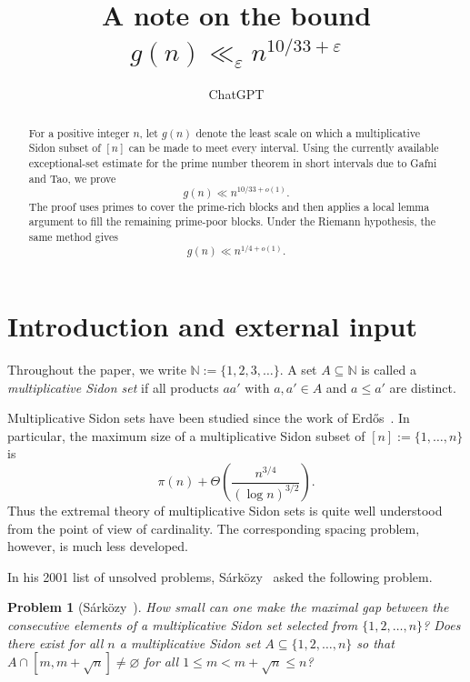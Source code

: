 \documentclass[11pt,reqno]{amsart}
\numberwithin{equation}{section}
\theoremstyle{plain}
\newtheorem{problem}[theorem]{Problem}
\theoremstyle{definition}
\newcommand{\N}{\mathbb N}
\begin{document}
\title[An upper bound for gaps in multiplicative Sidon sets]
{A note on the bound $g(n)\ll_\varepsilon n^{10/33+\varepsilon}$}

\author{ChatGPT}
\date{}

\begin{abstract}
For a positive integer \(n\), let \(g(n)\) denote the least scale on which a
multiplicative Sidon subset of \([n]\) can be made to meet every interval.
Using the currently available exceptional-set estimate for the prime number
theorem in short intervals due to Gafni and Tao, we prove
\[
        g(n) \ll n^{10/33+o(1)}.
\]
The proof uses primes to cover the prime-rich blocks and then applies a local
lemma argument to fill the remaining prime-poor blocks.  Under the Riemann
hypothesis, the same method gives
\[
        g(n)\ll n^{1/4+o(1)}.
\]
\end{abstract}

\maketitle

\section{Introduction and external input}

Throughout the paper, we write $\N:=\{1,2,3,\dots\}$. A set $A\subseteq\N$ is
called a \emph{multiplicative Sidon set} if all products $aa'$ with $a,a'\in A$
and $a\le a'$ are distinct.

Multiplicative Sidon sets have been studied since the work of
Erd\H{o}s~\cite{Erdos1938,Erdos1968}.  In particular, the maximum size of a
multiplicative Sidon subset of \([n]:=\{1,\dots,n\}\) is
\[
        \pi(n)+\Theta\!\left(\frac{n^{3/4}}{(\log n)^{3/2}}\right).
\]
Thus the extremal theory of multiplicative Sidon sets is quite well understood
from the point of view of cardinality.  The corresponding spacing problem,
however, is much less developed.

In his 2001 list of unsolved problems,
S\'ark\"ozy~\cite[Problem~34]{Sarkozy2001} asked the following problem.

\begin{problem}[S\'ark\"ozy~\cite{Sarkozy2001}]\label{prob:34}
How small can one make the maximal gap between the consecutive elements of a
multiplicative Sidon set selected from $\{1,2,\dots,n\}$? Does there exist for
all $n$ a multiplicative Sidon set $A\subseteq\{1,2,\dots,n\}$ so that
$A\cap [m,m+\sqrt n]\neq\varnothing$ for all $1\le m<m+\sqrt n\le n$?
\end{problem}
\end{document}
